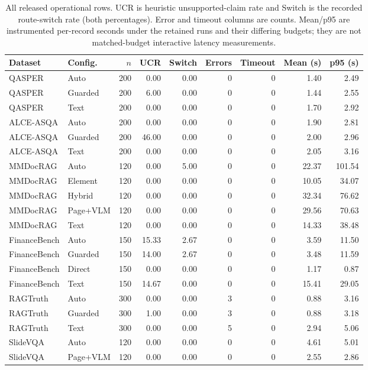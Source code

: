 \begin{table}[t]
\centering\small
\begin{tabular}{@{}llrrrrrrr@{}}
\toprule
Dataset & Config. & $n$ & UCR & Switch & Errors & Timeout & Mean (s) & p95 (s) \\
\midrule
QASPER & Auto & 200 & 0.00 & 0.00 & 0 & 0 & 1.40 & 2.49 \\
QASPER & Guarded & 200 & 6.00 & 0.00 & 0 & 0 & 1.44 & 2.55 \\
QASPER & Text & 200 & 0.00 & 0.00 & 0 & 0 & 1.70 & 2.92 \\
\midrule
ALCE-ASQA & Auto & 200 & 0.00 & 0.00 & 0 & 0 & 1.90 & 2.81 \\
ALCE-ASQA & Guarded & 200 & 46.00 & 0.00 & 0 & 0 & 2.00 & 2.96 \\
ALCE-ASQA & Text & 200 & 0.00 & 0.00 & 0 & 0 & 2.05 & 3.16 \\
\midrule
MMDocRAG & Auto & 120 & 0.00 & 5.00 & 0 & 0 & 22.37 & 101.54 \\
MMDocRAG & Element & 120 & 0.00 & 0.00 & 0 & 0 & 10.05 & 34.07 \\
MMDocRAG & Hybrid & 120 & 0.00 & 0.00 & 0 & 0 & 32.34 & 76.62 \\
MMDocRAG & Page+VLM & 120 & 0.00 & 0.00 & 0 & 0 & 29.56 & 70.63 \\
MMDocRAG & Text & 120 & 0.00 & 0.00 & 0 & 0 & 14.33 & 38.48 \\
\midrule
FinanceBench & Auto & 150 & 15.33 & 2.67 & 0 & 0 & 3.59 & 11.50 \\
FinanceBench & Guarded & 150 & 14.00 & 2.67 & 0 & 0 & 3.48 & 11.59 \\
FinanceBench & Direct & 150 & 0.00 & 0.00 & 0 & 0 & 1.17 & 0.87 \\
FinanceBench & Text & 150 & 14.67 & 0.00 & 0 & 0 & 15.41 & 29.05 \\
\midrule
RAGTruth & Auto & 300 & 0.00 & 0.00 & 3 & 0 & 0.88 & 3.16 \\
RAGTruth & Guarded & 300 & 1.00 & 0.00 & 3 & 0 & 0.88 & 3.18 \\
RAGTruth & Text & 300 & 0.00 & 0.00 & 5 & 0 & 2.94 & 5.06 \\
\midrule
SlideVQA & Auto & 120 & 0.00 & 0.00 & 0 & 0 & 4.61 & 5.01 \\
SlideVQA & Page+VLM & 120 & 0.00 & 0.00 & 0 & 0 & 2.55 & 2.86 \\
\bottomrule
\end{tabular}
\caption{All released operational rows. UCR is heuristic unsupported-claim rate and Switch is the recorded route-switch rate (both percentages). Error and timeout columns are counts. Mean/p95 are instrumented per-record seconds under the retained runs and their differing budgets; they are not matched-budget interactive latency measurements.}
\label{tab:all-operations}
\end{table}

